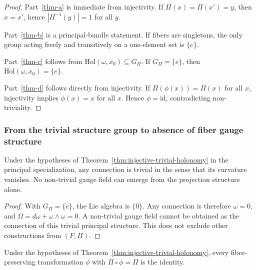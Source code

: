     \begin{proof}
      Part~\ref{thm-a} is immediate from injectivity.
      If $\Pi(x) = \Pi(x') = y$, then $x = x'$, hence $|\Pi^{-1}(y)| = 1$ for all $y$.

      Part~\ref{thm-b} is a principal-bundle statement.
      If fibers are singletons, the only group acting freely and transitively on a one-element set is $\{e\}$.

      Part~\ref{thm-c} follows from $\mathrm{Hol}(\omega, x_0) \subseteq G_\Pi$.
      If $G_\Pi = \{e\}$, then $\mathrm{Hol}(\omega, x_0) = \{e\}$.

      Part~\ref{thm-d} follows directly from injectivity.
      If $\Pi(\phi(x)) = \Pi(x)$ for all $x$, injectivity implies $\phi(x) = x$ for all $x$.
      Hence $\phi = \mathrm{id}$, contradicting non-triviality.
    \end{proof}

  \subsubsection*{From the trivial structure group to absence of fiber gauge structure}
    \label{subsec:stepA-gauge}

    \begin{corollary}
      \label{cor:no-gauge}
      Under the hypotheses of Theorem~\ref{thm:injective-trivial-holonomy} in the principal specialization,
      any connection is trivial in the sense that its curvature vanishes.
      No non-trivial gauge field can emerge from the projection structure alone.
    \end{corollary}

    \begin{proof}
      With $G_\Pi = \{e\}$, the Lie algebra is $\{0\}$.
      Any connection is therefore $\omega = 0$, and $\Omega = d\omega + \omega \wedge \omega = 0$.
      A non-trivial gauge field cannot be obtained as the connection of this trivial principal structure.
      This does not exclude other constructions from $(F,\Pi)$.
    \end{proof}

    \begin{corollary}
      \label{cor:no-diffeo}
      Under the hypotheses of Theorem~\ref{thm:injective-trivial-holonomy}, every fiber-preserving
      transformation $\phi$ with $\Pi\circ\phi=\Pi$ is the identity.
    \end{corollary}

